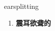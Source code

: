 
\begin{frame}
{\huge earsplitting}
\begin{center}
\begin{enumerate}\Large
  \item \textbf{震耳欲聋的}
\end{enumerate}
\end{center}
\end{frame}
